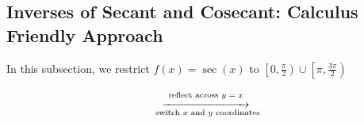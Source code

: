 \documentclass[12pt]{ximera}
\begin{document}
\subsection{Inverses of Secant and Cosecant: Calculus Friendly Approach}

In this subsection, we restrict $f(x) = \sec(x)$ to $\left[0, \frac{\pi}{2}\right) \cup \left[\pi, \frac{3\pi}{2}\right)$ 

\[ \begin{array}{ccc}



&

\stackrel{\stackrel{\mbox{\scriptsize reflect across $y=x$}}{\xrightarrow{\hspace{1in}}}}{\mbox{ \scriptsize switch $x$ and $y$ coordinates}} 

&



\end{array}\]
\end{document}
